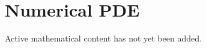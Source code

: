 
\section{Numerical PDE}

\begin{remark*}
Active mathematical content has not yet been added.
\end{remark*}

